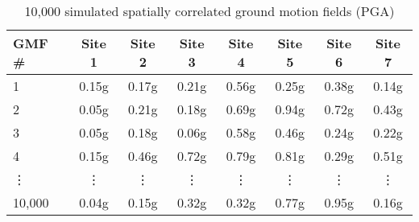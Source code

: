 \begin{table}[htbp]

\centering
\begin{tabular}{ l c c c c c c c }

\hline
\rowcolor{anti-flashwhite}
\bf{GMF \#} & \bf{Site 1} & \bf{Site 2} & \bf{Site 3} & \bf{Site 4} & \bf{Site 5} & \bf{Site 6} & \bf{Site 7}\\
\hline
1 & 0.15g & 0.17g & 0.21g & 0.56g & 0.25g & 0.38g & 0.14g \\
2 & 0.05g & 0.21g & 0.18g & 0.69g & 0.94g & 0.72g & 0.43g \\
3 & 0.05g & 0.18g & 0.06g & 0.58g & 0.46g & 0.24g & 0.22g \\
4 & 0.15g & 0.46g & 0.72g & 0.79g & 0.81g & 0.29g & 0.51g \\
\vdots & \vdots & \vdots & \vdots & \vdots & \vdots & \vdots & \vdots \\
10,000 & 0.04g & 0.15g & 0.32g & 0.32g & 0.77g & 0.95g & 0.16g \\
\hline
\end{tabular}

\caption{10,000 simulated spatially correlated ground motion fields (PGA)}
\label{tab:gmfs-sim-l7-10000}
\end{table}
